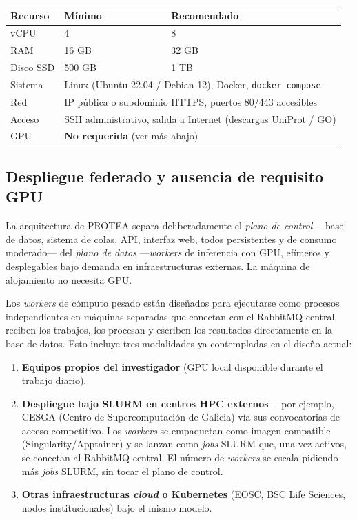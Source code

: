 \documentclass[11pt,a4paper]{article}
\begin{document}
\begin{center}
\begin{tabular}{lll}
\toprule
\textbf{Recurso} & \textbf{Mínimo} & \textbf{Recomendado} \\
\midrule
vCPU        & 4           & 8 \\
RAM         & 16 GB       & 32 GB \\
Disco SSD   & 500 GB      & 1 TB \\
Sistema     & \multicolumn{2}{l}{Linux (Ubuntu 22.04 / Debian 12), Docker, \texttt{docker compose}} \\
Red         & \multicolumn{2}{l}{IP pública o subdominio HTTPS, puertos 80/443 accesibles} \\
Acceso      & \multicolumn{2}{l}{SSH administrativo, salida a Internet (descargas UniProt / GO)} \\
GPU         & \multicolumn{2}{l}{\textbf{No requerida} (ver más abajo)} \\
\bottomrule
\end{tabular}
\end{center}

\subsection{Despliegue federado y ausencia de requisito GPU}

La arquitectura de PROTEA separa deliberadamente el \emph{plano de control}
—base de datos, sistema de colas, API, interfaz web, todos persistentes y de
consumo moderado— del \emph{plano de datos} —\emph{workers} de inferencia con
GPU, efímeros y desplegables bajo demanda en infraestructuras externas. La
máquina de alojamiento no necesita GPU.

Los \emph{workers} de cómputo pesado están diseñados para ejecutarse como
procesos independientes en máquinas separadas que conectan con el RabbitMQ
central, reciben los trabajos, los procesan y escriben los resultados
directamente en la base de datos. Esto incluye tres modalidades ya
contempladas en el diseño actual:

\begin{enumerate}[leftmargin=1.5em]
  \item \textbf{Equipos propios del investigador} (GPU local disponible durante
    el trabajo diario).
  \item \textbf{Despliegue bajo SLURM en centros HPC externos} —por ejemplo,
    CESGA (Centro de Supercomputación de Galicia) vía sus convocatorias de
    acceso competitivo. Los \emph{workers} se empaquetan como imagen
    compatible (Singularity/Apptainer) y se lanzan como \emph{jobs} SLURM que,
    una vez activos, se conectan al RabbitMQ central. El número de
    \emph{workers} se escala pidiendo más \emph{jobs} SLURM, sin tocar el
    plano de control.
  \item \textbf{Otras infraestructuras \emph{cloud} o Kubernetes} (EOSC, BSC
    Life Sciences, nodos institucionales) bajo el mismo modelo.
\end{enumerate}
\end{document}
